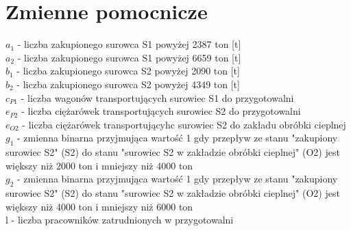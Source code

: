 \section{Zmienne pomocnicze}
$a_1$ - liczba zakupionego surowca S1 powyżej 2387 ton [t] \\
$a_2$ - liczba zakupionego surowca S1 powyżej 6659 ton [t] \\
$b_1$ - liczba zakupionego surowca S2 powyżej 2090 ton [t] \\
$b_2$ - liczba zakupionego surowca S2 powyżej 4349 ton [t] \\
$c_{P1}$ - liczba wagonów transportujących surowiec S1 do przygotowalni \\ 
$e_{P2}$ - liczba ciężarówek transportujących surowiec S2 do przygotowalni \\
$e_{O2}$ - liczba ciężarówek transportującyhc surowiec S2 do zakładu obróbki cieplnej \\
$g_1$ - zmienna binarna przyjmująca wartość 1 gdy przepływ ze stanu "zakupiony surowiec S2" (S2) do stanu "surowiec S2 w zakładzie obróbki cieplnej" (O2) jest większy niż 2000 ton i mniejszy niż 4000 ton \\ 
$g_2$ - zmienna binarna przyjmująca wartość 1 gdy przepływ ze stanu "zakupiony surowiec S2" (S2) do stanu "surowiec S2 w zakładzie obróbki cieplnej" (O2) jest większy niż 4000 ton i mniejszy niż 6000 ton \\
l - liczba pracowników zatrudnionych w przygotowalni
